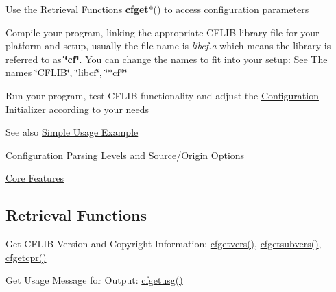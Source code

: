 \begin{DoxyEnumerate}
\item Use the \hyperlink{index_retrieval_functions}{Retrieval Functions} {\bfseries cfget$\ast$}() to access configuration parameters
\end{DoxyEnumerate}


\begin{DoxyEnumerate}
\item Compile your program, linking the appropriate C\-F\-L\-I\-B library file for your platform and setup, usually the file name is {\itshape libcf.\-a\/} which means the library is referred to as {\bfseries \char`\"{}cf\char`\"{}}. You can change the names to fit into your setup\-: See \hyperlink{properties_names}{The names \char`\"{}\-C\-F\-L\-I\-B\char`\"{}, \char`\"{}libcf\char`\"{}, \char`\"{}$\ast$cf$\ast$\char`\"{}}
\end{DoxyEnumerate}


\begin{DoxyEnumerate}
\item Run your program, test C\-F\-L\-I\-B functionality and adjust the \hyperlink{config_initializer}{Configuration Initializer} according to your needs
\end{DoxyEnumerate}

\begin{DoxySeeAlso}{See also}
\hyperlink{simple_example}{Simple Usage Example} 

\hyperlink{config_levels}{Configuration Parsing Levels and Source/\-Origin Options} 

\hyperlink{group__cflib__core}{Core Features}
\end{DoxySeeAlso}
\hypertarget{index_retrieval_functions}{}\subsection{Retrieval Functions}\label{index_retrieval_functions}

\begin{DoxyEnumerate}
\item Get C\-F\-L\-I\-B Version and Copyright Information\-: \hyperlink{group__retrieval_gac4e376e3630e9b25655ee0e0b1a54a5b}{cfgetvers()}, \hyperlink{group__retrieval_ga160032675def60398ebfd66589ddc1e5}{cfgetsubvers()}, \hyperlink{group__retrieval_ga9999522b2acf8760f420d2567e7f7c50}{cfgetcpr()}
\end{DoxyEnumerate}


\begin{DoxyEnumerate}
\item Get Usage Message for Output\-: \hyperlink{group__retrieval_gad3e4e24668cdc111471332a7e79fc897}{cfgetusg()}
\end{DoxyEnumerate}


